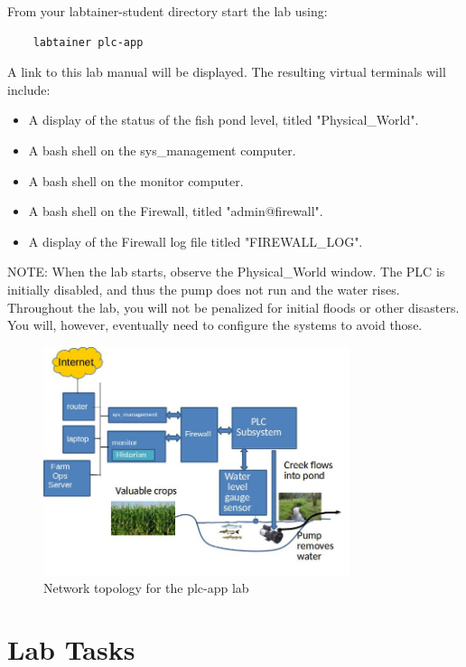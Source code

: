 From your labtainer-student directory start the lab using:
\begin{verbatim}
    labtainer plc-app
\end{verbatim}
\noindent A link to this lab manual will be displayed.  
The resulting virtual terminals will include:
\begin{itemize}
\item A display of the status of the fish pond level, titled "Physical\_World".
\item A bash shell on the sys\_management computer.
\item A bash shell on the monitor computer.
\item A bash shell on the Firewall, titled "admin@firewall".
\item A display of the Firewall log file titled "FIREWALL\_LOG".
\end{itemize}
\noindent NOTE: When the lab starts, observe the Physical\_World window. 
The PLC is initially disabled, and thus the pump does not run and the water rises.
Throughout the lab, you will not be penalized for initial floods or other disasters.
You will, however, eventually need to configure the systems to avoid those.

\begin{figure}[htb]
\begin{center}
\includegraphics [width=0.8\textwidth,natwidth=621,natheight=403]{plc-app.jpg}
\end{center}
\caption{Network topology for the plc-app lab}
\label{fig:topology}
\end{figure}

\section{Lab Tasks}

